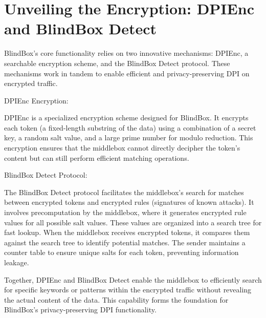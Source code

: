 \documentclass[conference]{IEEEtran}
\begin{document}
\section{Unveiling the Encryption: DPIEnc and BlindBox Detect}
BlindBox's core functionality relies on two innovative mechanisms: DPIEnc, a searchable encryption scheme, and the BlindBox Detect protocol. These mechanisms work in tandem to enable efficient and privacy-preserving DPI on encrypted traffic.

DPIEnc Encryption:

DPIEnc is a specialized encryption scheme designed for BlindBox. It encrypts each token (a fixed-length substring of the data) using a combination of a secret key, a random salt value, and a large prime number for modulo reduction. This encryption ensures that the middlebox cannot directly decipher the token's content but can still perform efficient matching operations.

BlindBox Detect Protocol:

The BlindBox Detect protocol facilitates the middlebox's search for matches between encrypted tokens and encrypted rules (signatures of known attacks). It involves precomputation by the middlebox, where it generates encrypted rule values for all possible salt values. These values are organized into a search tree for fast lookup. When the middlebox receives encrypted tokens, it compares them against the search tree to identify potential matches. The sender maintains a counter table to ensure unique salts for each token, preventing information leakage.

Together, DPIEnc and BlindBox Detect enable the middlebox to efficiently search for specific keywords or patterns within the encrypted traffic without revealing the actual content of the data. This capability forms the foundation for BlindBox's privacy-preserving DPI functionality.
\end{document}
